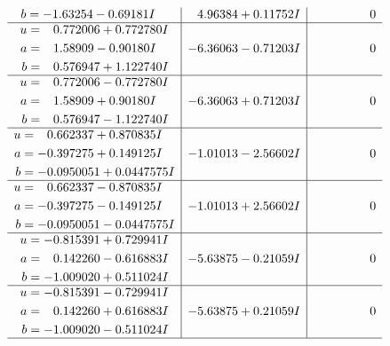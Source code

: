 \documentclass[1p]{elsarticle_modified}
\theoremstyle{definition}
\begin{document}
$$\begin{array}{c|c|c}
\begin{aligned}
b &= -1.63254 - 0.69181 I\end{aligned}
 & \phantom{-}4.96384 + 0.11752 I & \phantom{-0.000000 } 0 \\ \hline\begin{aligned}
u &= \phantom{-}0.772006 + 0.772780 I \\
a &= \phantom{-}1.58909 - 0.90180 I \\
b &= \phantom{-}0.576947 + 1.122740 I\end{aligned}
 & -6.36063 - 0.71203 I & \phantom{-0.000000 } 0 \\ \hline\begin{aligned}
u &= \phantom{-}0.772006 - 0.772780 I \\
a &= \phantom{-}1.58909 + 0.90180 I \\
b &= \phantom{-}0.576947 - 1.122740 I\end{aligned}
 & -6.36063 + 0.71203 I & \phantom{-0.000000 } 0 \\ \hline\begin{aligned}
u &= \phantom{-}0.662337 + 0.870835 I \\
a &= -0.397275 + 0.149125 I \\
b &= -0.0950051 + 0.0447575 I\end{aligned}
 & -1.01013 - 2.56602 I & \phantom{-0.000000 } 0 \\ \hline\begin{aligned}
u &= \phantom{-}0.662337 - 0.870835 I \\
a &= -0.397275 - 0.149125 I \\
b &= -0.0950051 - 0.0447575 I\end{aligned}
 & -1.01013 + 2.56602 I & \phantom{-0.000000 } 0 \\ \hline\begin{aligned}
u &= -0.815391 + 0.729941 I \\
a &= \phantom{-}0.142260 - 0.616883 I \\
b &= -1.009020 + 0.511024 I\end{aligned}
 & -5.63875 - 0.21059 I & \phantom{-0.000000 } 0 \\ \hline\begin{aligned}
u &= -0.815391 - 0.729941 I \\
a &= \phantom{-}0.142260 + 0.616883 I \\
b &= -1.009020 - 0.511024 I\end{aligned}
 & -5.63875 + 0.21059 I & \phantom{-0.000000 } 0\\
 \hline 
 \end{array}$$\newpage$$\begin{array}{c|c|c}  

\end{array}$$
\end{document}
